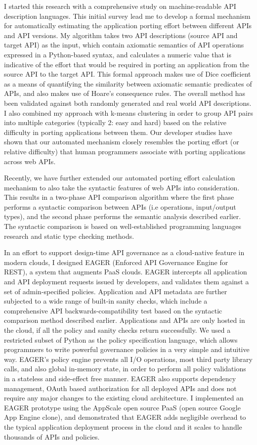 I started this research with a comprehensive study on machine-readable API description languages. This initial survey lead me to develop a formal mechanism for automatically estimating the application porting effort between different APIs and API versions. My algorithm takes two API descriptions (source API and target API) as the input, which contain axiomatic semantics of API operations expressed in a Python-based syntax, and calculates a numeric value that is indicative of the effort that would be required in porting an application from the source API to the target API. This formal approach makes use of Dice coefficient as a means of quantifying the similarity between axiomatic semantic predicates of APIs, and also makes use of Hoare's consequence rules. The overall method has been validated against both randomly generated and real world API descriptions. I also combined my approach with k-means clustering in order to group API pairs into multiple categories (typically 2: easy and hard) based on the relative difficulty in porting applications between them. Our developer studies have shown that our automated mechanism closely resembles the porting effort (or relative difficulty) that human programmers associate with porting applications across web APIs.

Recently, we have further extended our automated porting effort calculation mechanism to also take the syntactic features of web APIs into consideration. This results in a two-phase API comparison algorithm where the first phase performs a syntactic comparison between APIs (i.e operations, input/output types), and the second phase performs the semantic analysis described earlier. The syntactic comparison is based on well-established programming languages research and static type checking methods.

In an effort to support design-time API governance as a cloud-native feature in modern clouds, I designed EAGER (Enforced API Governance Engine for REST), a system that augments PaaS clouds. EAGER intercepts all application and API deployment requests issued by developers, and validates them against a set of admin-specified policies. Application and API metadata are further subjected to a wide range of built-in sanity checks, which include a comprehensive API backwards-compatibility test based on the syntactic comparison method described earlier. Applications and APIs are only hosted in the cloud, if all the policy and sanity checks return successfully. We used a restricted subset of Python as the policy specification language, which allows programmers to write powerful governance policies in a very simple and intuitive way. EAGER's policy engine prevents all I/O operations, most third party library calls, and also global in-memory state, in order to perform all policy validations in a stateless and side-effect free manner. EAGER also supports dependency management, OAuth based authorization for all deployed APIs and does not require any major changes to the existing cloud architecture. I implemented an EAGER prototype using the AppScale open source PaaS (open source Google App Engine clone), and demonstrated that EAGER adds negligible overhead to the typical application deployment process in the cloud and it scales to handle thousands of APIs and policies.
